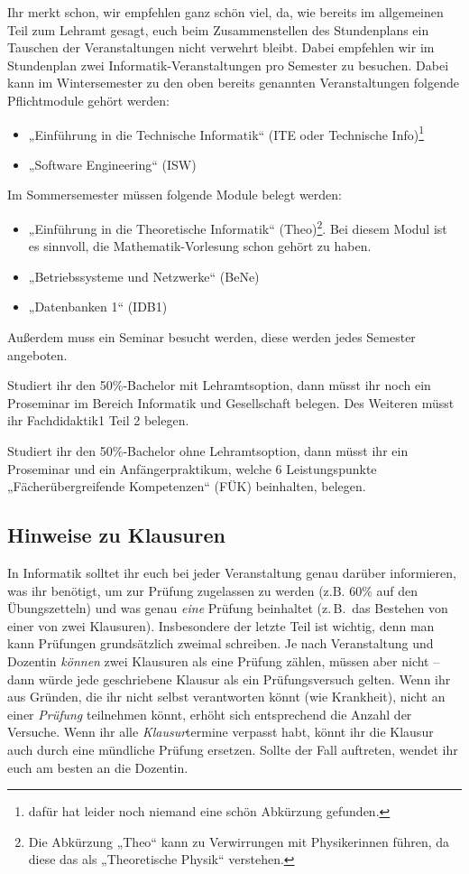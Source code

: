 Ihr merkt schon, wir empfehlen ganz schön viel, da, wie bereits im allgemeinen Teil zum Lehramt gesagt, euch beim Zusammenstellen des Stundenplans ein Tauschen der Veranstaltungen nicht verwehrt bleibt. Dabei empfehlen wir im Stundenplan zwei Informatik-Veranstaltungen pro Semester zu besuchen. Dabei kann im Wintersemester zu den oben bereits genannten Veranstaltungen folgende Pflichtmodule gehört werden: 
\begin{itemize}
    \item „Einführung in die Technische Informatik“ (\gls{ITE} oder Technische Info)\footnote{dafür hat leider noch niemand eine schön Abkürzung gefunden.}
    \item „Software Engineering“ (\gls{ISW})
\end{itemize}
Im Sommersemester müssen folgende Module belegt werden:
\begin{itemize}
    \item „Einführung in die Theoretische Informatik“ (\gls{Theo})\footnote{Die Abkürzung „Theo“ kann zu Verwirrungen mit Physikerinnen führen, da diese das als „Theoretische Physik“ verstehen.}. Bei diesem Modul ist es sinnvoll, die Mathematik-Vorlesung schon gehört zu haben.
    \item „Betriebssysteme und Netzwerke“ (\gls{BeNe})
    \item „Datenbanken 1“ (\gls{IDB1})
\end{itemize}
Außerdem muss ein Seminar besucht werden, diese werden jedes Semester angeboten. 

Studiert ihr den 50\%-Bachelor mit Lehramtsoption, dann müsst ihr noch ein Proseminar im Bereich Informatik und Gesellschaft belegen. Des Weiteren müsst ihr Fachdidaktik1 Teil 2 belegen. 

Studiert ihr den 50\%-Bachelor ohne Lehramtsoption, dann müsst ihr ein Proseminar und ein Anfängerpraktikum, welche 6 Leistungspunkte „Fächerübergreifende Kompetenzen“ (FÜK) beinhalten, belegen. 

\subsection{Hinweise zu Klausuren}
In Informatik solltet ihr euch bei jeder Veranstaltung genau darüber informieren, was ihr benötigt, um zur Prüfung zugelassen zu werden (z.B. 60\% auf den Übungszetteln) und was genau \emph{eine} Prüfung beinhaltet (z.\,B.\ das Bestehen von einer von zwei Klausuren). Insbesondere der letzte Teil ist wichtig, denn man kann Prüfungen grundsätzlich zweimal schreiben. Je nach Veranstaltung und Dozentin \emph{können} zwei Klausuren als eine Prüfung zählen, müssen aber nicht -- dann würde jede geschriebene Klausur als ein Prüfungsversuch gelten. Wenn ihr aus Gründen, die ihr nicht selbst verantworten könnt (wie Krankheit), nicht an einer \emph{Prüfung} teilnehmen könnt, erhöht sich entsprechend die Anzahl der Versuche. Wenn ihr alle \emph{Klausur}termine verpasst habt, könnt ihr die Klausur auch durch eine mündliche Prüfung ersetzen. Sollte der Fall auftreten, wendet ihr euch am besten an die Dozentin.

